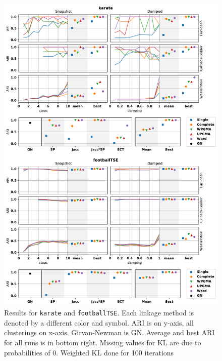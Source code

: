 \begin{figure}
    \centering
    \includegraphics[height=.95\textheight]{power/ARI1.pdf}
    \caption[Experimental clustering results for \texttt{karate} and \texttt{footballTSE}]{Results for \texttt{karate} and \texttt{footballTSE}. Each linkage method is denoted by a different color and symbol.
    ARI is on y-axis, all clusterings on x-axis.
    Girvan-Newman is GN. Average and best ARI for all runs is in bottom right. Missing values for KL are due to probabilities of 0. Weighted KL done for 100 iterations}
    \label{fig:ARI1}
\end{figure}
